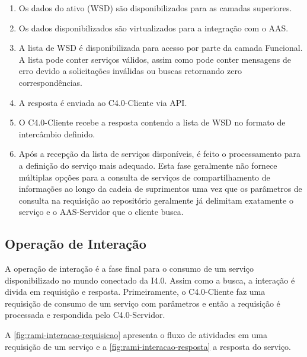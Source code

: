 	\begin{enumerate}
		\item Os dados do ativo (WSD) são disponibilizados para as camadas superiores.
		
		\item Os dados disponibilizados são virtualizados para a integração com o AAS.
		
		
		\item A lista de WSD é disponibilizada para acesso por parte da camada Funcional. A lista  pode conter serviços válidos, assim como pode conter mensagens de erro devido a solicitações inválidas ou buscas retornando zero correspondências.

		\item A resposta é enviada ao C4.0-Cliente via API.
		
		\item O C4.0-Cliente recebe a resposta contendo a lista de WSD no formato de intercâmbio definido.
		
		\item Após a recepção da lista de serviços disponíveis, é feito o processamento para a definição do serviço mais adequado. Esta fase geralmente não fornece múltiplas opções para a consulta de serviços de compartilhamento de informações ao longo da cadeia de suprimentos uma vez que os parâmetros de consulta na requisição ao repositório geralmente já delimitam exatamente o serviço e o AAS-Servidor que o cliente busca.
	\end{enumerate}

\subsection{Operação de Interação}

	A operação de interação é a fase final para o consumo de um serviço disponibilizado no mundo conectado da I4.0. Assim como a busca, a interação é divida em requisição e resposta. Primeiramente, o C4.0-Cliente faz uma requisição de consumo de um serviço com parâmetros e então a requisição é processada e respondida pelo C4.0-Servidor.
	
	 A \autoref{fig:rami-interacao-requisicao} apresenta o fluxo de atividades em uma requisição de um serviço e a \autoref{fig:rami-interacao-resposta} a resposta do serviço.
	
